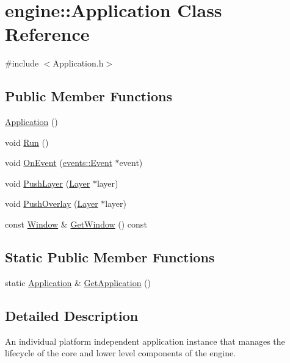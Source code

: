 \hypertarget{classengine_1_1Application}{}\section{engine\+:\+:Application Class Reference}
\label{classengine_1_1Application}


{\ttfamily \#include $<$Application.\+h$>$}

\subsection*{Public Member Functions}
\begin{DoxyCompactItemize}
\item 
\hyperlink{classengine_1_1Application_a9740cd2e55318cbc5684a6c4c2f3304f}{Application} ()
\item 
void \hyperlink{classengine_1_1Application_a4dcdf08d920f7f63013a25cb1e80438b}{Run} ()
\item 
void \hyperlink{classengine_1_1Application_a093e14152fc1eda1b5eba682a2b4afd9}{On\+Event} (\hyperlink{classengine_1_1events_1_1Event}{events\+::\+Event} $\ast$event)
\item 
void \hyperlink{classengine_1_1Application_adb129a86a6cdbd80b25094d08605d213}{Push\+Layer} (\hyperlink{classengine_1_1Layer}{Layer} $\ast$layer)
\item 
void \hyperlink{classengine_1_1Application_a00041c455b5699665d21662be95abd85}{Push\+Overlay} (\hyperlink{classengine_1_1Layer}{Layer} $\ast$layer)
\item 
const \hyperlink{classengine_1_1Window}{Window} \& \hyperlink{classengine_1_1Application_a0c66a3ff294bcc497bb2e8eb7330124c}{Get\+Window} () const
\end{DoxyCompactItemize}
\subsection*{Static Public Member Functions}
\begin{DoxyCompactItemize}
\item 
static \hyperlink{classengine_1_1Application}{Application} \& \hyperlink{classengine_1_1Application_a639cdab87d3c5a14d0a9e9203d6c7c97}{Get\+Application} ()
\end{DoxyCompactItemize}


\subsection{Detailed Description}
An individual platform independent application instance that manages the lifecycle of the core and lower level components of the engine. 

